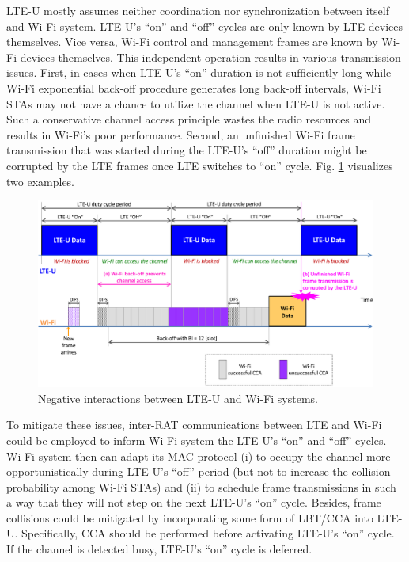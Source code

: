 LTE-U mostly assumes neither coordination nor synchronization between itself and Wi-Fi system. LTE-U's ``on'' and ``off'' cycles are only known by LTE devices themselves. Vice versa, Wi-Fi control and management frames are known by Wi-Fi devices themselves. This independent operation results in various transmission issues. First, in cases when LTE-U's ``on'' duration is not sufficiently long while Wi-Fi exponential back-off procedure generates long back-off intervals, Wi-Fi STAs may not have a chance to utilize the channel when LTE-U is not active. Such a conservative channel access principle wastes the radio resources and results in Wi-Fi's poor performance. Second, an unfinished Wi-Fi frame transmission that was started during the LTE-U's ``off'' duration might be corrupted by the LTE frames once LTE switches to ``on'' cycle. Fig. \ref{figs:LTE-U-enhancement1} visualizes two examples.
\begin{figure}[!ht]
	\centering
	\includegraphics[width=1.0\columnwidth]{figs/LTE-U-enhancement1}
	\caption{Negative interactions between LTE-U and Wi-Fi systems.}
	\label{figs:LTE-U-enhancement1}
\end{figure}

To mitigate these issues, inter-RAT communications between LTE and Wi-Fi could be employed to inform Wi-Fi system the LTE-U's ``on'' and ``off'' cycles. Wi-Fi system then can adapt its MAC protocol (i) to occupy the channel more opportunistically during LTE-U's ``off'' period (but not to increase the collision probability among Wi-Fi STAs) and (ii) to schedule frame transmissions in such a way that they will not step on the next LTE-U's ``on'' cycle. Besides, frame collisions could be mitigated by incorporating some form of LBT/CCA into LTE-U. Specifically, CCA should be performed before activating LTE-U's ``on'' cycle. If the channel is detected busy, LTE-U's ``on'' cycle is deferred.

